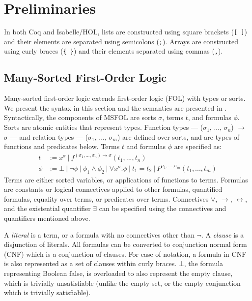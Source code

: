 \documentclass{article}
\begin{document}
	\section{Preliminaries}
	\label{sec:prelims}
	
	In both Coq and Isabelle/HOL,
	lists are constructed using 
	square brackets (\texttt{[ ]})
	and their elements are separated 
	using semicolons (\texttt{;}). 
	Arrays are constructed using 
	curly braces (\texttt{\{ \}})
	and their elements separated 
	using commas (\texttt{,}).
	
	\subsection{Many-Sorted First-Order Logic}
	\label{sec:msfol}
	Many-sorted first-order logic extends
	first-order logic (FOL) with 
	types or sorts. We present the 
	syntax in this section and the 
	semantics are presented in
	\cite{Barrett2018}. Syntactically, 
	the components of MSFOL are sorts 
	$\sigma$, terms $t$, and 
	formulas $\phi$. Sorts are 
	atomic entities that 
	represent types. Function types 
	--- ($\sigma_1$, ..., $\sigma_n$) 
	$\to$ $\sigma$ ---
	and relation types 
	--- ($\sigma_1$, ..., $\sigma_m$)
	are defined over sorts, and 
	are types of functions and 
	predicates below. Terms $t$ and 
	formulas $\phi$ are specified as:
	\begin{align*}
	t &:= x^{\sigma}\ |\ 
	f^{(\sigma_1, ..., \sigma_n) \to 
		\sigma}	(t_1, ..., t_n)\\
	\phi &:= \bot\ |\ \neg \phi\ |\ 
	\phi_1 \land \phi_2\ |\ \forall 
	x^{\sigma} . \phi\ |\ t_1 = t_2
	\ |\ P^{\sigma_1,...,\sigma_m}
	(t_1, ..., t_m)
	\end{align*}
	Terms are either sorted variables, 
	or applications of functions to terms.
	Formulas are constants or logical 
	connectives applied to other 
	formulas, quantified formulas, 
	equality over terms, or predicates 
	over terms. Connectives $\lor$, 
	$\to$, $\leftrightarrow$, and the 
	existential	quantifier $\exists$ 
	can be specified using the connectives 
	and quantifiers mentioned above.
	
	A \textit{literal} is a term, or a 
	formula with no connectives other than 
	$\neg$. A \textit{clause} is a 
	disjunction of literals. All formulas 
	can be converted to conjunction normal 
	form (CNF) which is a conjunction of 
	clauses. For ease of notation, 
	a formula in CNF is also represented
	as a set of clauses within curly 
	braces. $\bot$, the formula 
	representing Boolean false, 
	is overloaded to also represent
	the empty clause, which is trivially
	unsatisfiable (unlike the empty set,
	or the empty conjunction which is 
	trivially satisfiable).
	
\end{document}
